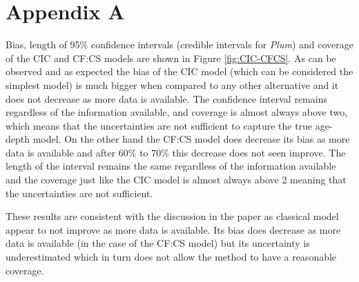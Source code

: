 \documentclass [10pt] {article}
\begin{document}
\section{Appendix A}

Bias, length of 95\% confidence intervals (credible intervals for \textit{Plum}) and coverage of the CIC and CF:CS models are shown in Figure \ref{fig:CIC-CFCS}.
As can be observed and as expected the bias of the CIC model (which can be considered the simplest model) is much bigger when compared to any other alternative and it does not decrease as more data is available.
The confidence interval remains regardless of the information available, and coverage is almost always above two, which means that the uncertainties are not sufficient to capture the true age-depth model.
On the other hand the CF:CS model does decrease its bias as more data is available and after 60\% to 70\% this decrease does not seen improve.
The length of the interval remains the same regardless of the information available and the coverage just like the CIC model is almost always above 2 meaning that the uncertainties are not sufficient.

These results are consistent with the discussion in the paper as classical model appear to not improve as more data is available. Its bias does decrease as more data is available (in the case of the CF:CS model) but its uncertainty is underestimated which in turn does not allow the method to have a reasonable coverage. 
\end{document}
